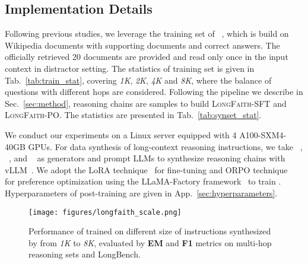 \subsection{Implementation Details} Following previous studies, we leverage the training set of \musique~\cite{musique}, which is build on Wikipedia documents with supporting documents and correct answers. The officially retrieved 20 documents are provided and read only once in the input context in distractor setting. The statistics of training set is given in Tab.~\ref{tab:train_stat}, covering \textit{1K}, \textit{2K}, \textit{4K} and \textit{8K}, where the balance of questions with different hops are considered. Following the pipeline we describe in Sec.~\ref{sec:method}, reasoning chains are samples to build \textsc{LongFaith}-SFT and \textsc{LongFaith}-PO. The statistics are presented in Tab.~\ref{tab:synset_stat}.

We conduct our experiments on a Linux server equipped with 4 A100-SXM4-40GB GPUs. For data synthesis of long-context reasoning instructions, we take \textit{\llama}~\cite{llama3}, \textit{\qwen}~\cite{qwen2.5}, \textit{\llamal} and \textit{\gpt}~\cite{gpt-4o} as generators and prompt LLMs to synthesize reasoning chains with vLLM~\cite{vllm}. We adopt the LoRA technique~\cite{lora} for fine-tuning and ORPO technique~\cite{orpo} for preference optimization using the LLaMA-Factory framework~\cite{llamafactory} to train \textit{\llama}. Hyperparameters of post-training are given in App.~\ref{sec:hyperparameters}.

\begin{figure}[!t]
    \centering
    \centerline{\texttt{[image: figures/longfaith\_scale.png]}}
    \caption{Performance of \textit{\llama} trained on different size of instructions synthesized by \textit{\qwen} from \textit{1K} to \textit{8K}, evaluated by \textbf{EM} and \textbf{F1} metrics on multi-hop reasoning sets and LongBench.}
    \label{fig:scale}
\end{figure}

